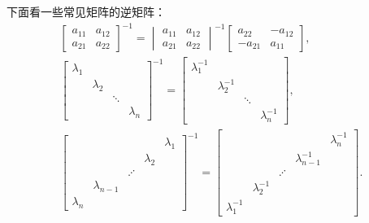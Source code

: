 \begin{example}
下面看一些常见矩阵的逆矩阵：\begin{gather*}
	\begin{bmatrix}
		a_{11} & a_{12} \\
		a_{21} & a_{22}
	\end{bmatrix}^{-1}
	= \begin{vmatrix}
		a_{11} & a_{12} \\
		a_{21} & a_{22}
	\end{vmatrix}^{-1}
	\begin{bmatrix}
		a_{22} & -a_{12} \\
		-a_{21} & a_{11}
	\end{bmatrix}, \\
	\begin{bmatrix}
		\lambda_1 \\
		& \lambda_2 \\
		&& \ddots \\
		&&& \lambda_n
	\end{bmatrix}^{-1}
	= \begin{bmatrix}
		\lambda_1^{-1} \\
		& \lambda_2^{-1} \\
		&& \ddots \\
		&&& \lambda_n^{-1}
	\end{bmatrix}, \\
	\begin{bmatrix}
		& & & & \lambda_1 \\
		& & & \lambda_2 \\
		& & \iddots \\
		& \lambda_{n-1} \\
		\lambda_n
	\end{bmatrix}^{-1}
	= \begin{bmatrix}
		& & & & \lambda_n^{-1} \\
		& & & \lambda_{n-1}^{-1} \\
		& & \iddots \\
		& \lambda_2^{-1} \\
		\lambda_1^{-1}
	\end{bmatrix}.
\end{gather*}
\end{example}

